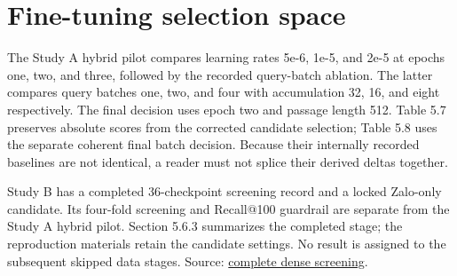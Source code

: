 \section{Fine-tuning selection space}

The Study A hybrid pilot compares learning rates 5e-6, 1e-5, and 2e-5 at epochs one, two, and three, followed by the recorded query-batch ablation. The latter compares query batches one, two, and four with accumulation 32, 16, and eight respectively. The final decision uses epoch two and passage length 512. Table 5.7 preserves absolute scores from the corrected candidate selection; Table 5.8 uses the separate coherent final batch decision. Because their internally recorded baselines are not identical, a reader must not splice their derived deltas together.

Study B has a completed 36-checkpoint screening record and a locked Zalo-only candidate. Its four-fold screening and Recall@100 guardrail are separate from the Study A hybrid pilot. Section 5.6.3 summarizes the completed stage; the reproduction materials retain the candidate settings. No result is assigned to the subsequent skipped data stages. Source: \href{../experiments/LEGAL_BGE_DENSE_BENCH_20260830T054623Z_6a8c7b00/cv_results/zalo_only_screening_cv.json}{complete dense screening}.
